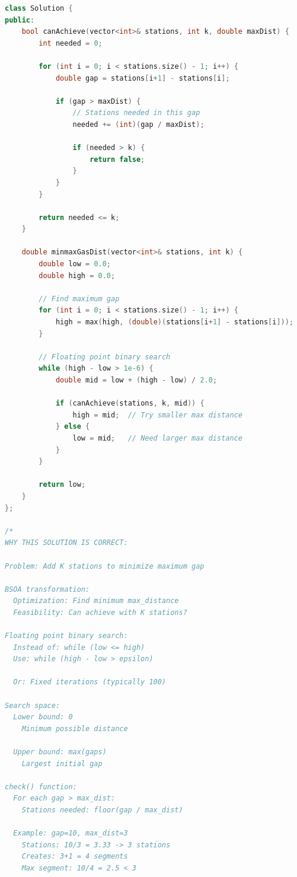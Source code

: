 \documentclass[11pt,a4paper,oneside]{book}
\begin{document}
\begin{lstlisting}[language=C++, caption=Complete BSOA Solutions - Minimize Maximum]
class Solution {
public:
    bool canAchieve(vector<int>& stations, int k, double maxDist) {
        int needed = 0;
        
        for (int i = 0; i < stations.size() - 1; i++) {
            double gap = stations[i+1] - stations[i];
            
            if (gap > maxDist) {
                // Stations needed in this gap
                needed += (int)(gap / maxDist);
                
                if (needed > k) {
                    return false;
                }
            }
        }
        
        return needed <= k;
    }
    
    double minmaxGasDist(vector<int>& stations, int k) {
        double low = 0.0;
        double high = 0.0;
        
        // Find maximum gap
        for (int i = 0; i < stations.size() - 1; i++) {
            high = max(high, (double)(stations[i+1] - stations[i]));
        }
        
        // Floating point binary search
        while (high - low > 1e-6) {
            double mid = low + (high - low) / 2.0;
            
            if (canAchieve(stations, k, mid)) {
                high = mid;  // Try smaller max distance
            } else {
                low = mid;   // Need larger max distance
            }
        }
        
        return low;
    }
};

/*
WHY THIS SOLUTION IS CORRECT:

Problem: Add K stations to minimize maximum gap

BSOA transformation:
  Optimization: Find minimum max_distance
  Feasibility: Can achieve with K stations?

Floating point binary search:
  Instead of: while (low <= high)
  Use: while (high - low > epsilon)
  
  Or: Fixed iterations (typically 100)

Search space:
  Lower bound: 0
    Minimum possible distance
  
  Upper bound: max(gaps)
    Largest initial gap

check() function:
  For each gap > max_dist:
    Stations needed: floor(gap / max_dist)
  
  Example: gap=10, max_dist=3
    Stations: 10/3 = 3.33 -> 3 stations
    Creates: 3+1 = 4 segments
    Max segment: 10/4 = 2.5 < 3 


\end{lstlisting}
\end{document}
